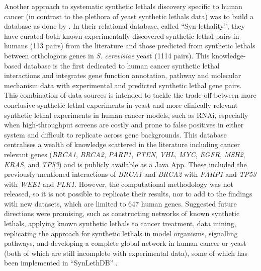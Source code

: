 Another approach to systematic \glspl{synthetic lethal} discovery specific to human cancer (in contrast to the plethora of yeast \glspl{synthetic lethal} data) was to build a database as done by \citet{Li2014}. In their relational database, called ``Syn-lethality'', they have curated both known experimentally discovered \gls{synthetic lethal} pairs in humans (113 pairs) from the literature and those predicted from \glspl{synthetic lethal} between orthologous genes in \textit{S. cerevisiae} yeast (1114 pairs). This knowledge-based database is the first dedicated to human cancer \gls{synthetic lethal} interactions and integrates gene function annotation, pathway and molecular mechanism data with experimental and predicted \gls{synthetic lethal} gene pairs. This combination of data sources is intended to tackle the trade-off between more conclusive \gls{synthetic lethal} experiments in yeast and more clinically relevant \gls{synthetic lethal} experiments in human cancer models, such as \gls{RNAi}, especially when high-throughput screens are costly and prone to false positives in either system and difficult to replicate across gene backgrounds. This database centralises a wealth of knowledge scattered in the literature including cancer relevant genes (\textit{BRCA1}, \textit{BRCA2}, \textit{PARP1}, \textit{PTEN}, \textit{VHL}, \textit{MYC}, \textit{EGFR}, \textit{MSH2}, \textit{KRAS}, and \textit{TP53}) and is publicly available as a Java App. These included the previously mentioned interactions of \textit{BRCA1} and \textit{BRCA2} with \textit{PARP1} and \textit{TP53} with \textit{WEE1} and \textit{PLK1}. However, the computational methodology was not released, so it is not possible to replicate their results, nor to add to the findings with new datasets, which are limited to 647 human genes. Suggested future directions were promising, such as constructing networks of known \glspl{synthetic lethal}, applying known \glspl{synthetic lethal} to cancer treatment, data mining, replicating the approach for \glspl{synthetic lethal} in model organisms, signalling pathways, and developing a complete global network in human cancer or yeast (both of which are still incomplete with experimental data), some of which has been implemented in ``SynLethDB'' \citep{Guo2016}.  


